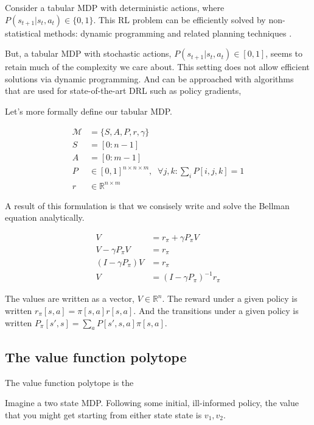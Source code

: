 Consider a tabular MDP with deterministic actions, where $P(s_{t+1}|s_t, a_t) \in \{ 0, 1\}$.
This RL problem can be efficiently solved by non-statistical
methods: dynamic programming and related planning techniques \cite{Bertsekas1995}.

But, a tabular MDP with stochastic actions, $P(s_{t+1}|s_t, a_t) \in [0, 1]$,
seems to retain much of the complexity we care about. This setting does not allow
efficient solutions via dynamic programming. And can be approached with algorithms
that are used for state-of-the-art DRL such as policy gradients,

Let's more formally define our tabular MDP.

\begin{align}
\mathcal M &= \{S, A, P, r, \gamma\} \\
S &= [0:n-1] \\
A &= [0:m-1] \\
P &\in [0,1]^{n\times n \times m}, \;\;\forall j, k : \sum_i P[i, j, k] = 1 \\
r &\in \mathbb R^{n\times m}
\end{align}

A result of this formulation is that we consisely write and solve the Bellman equation analytically.

\begin{align}
V &= r_{\pi} + \gamma P_{\pi} V \tag{the bellman eqn}\\
V - \gamma P_{\pi} V &= r_{\pi}\\
(I-\gamma P_{\pi})V &= r_{\pi}\\
V &= (I-\gamma P_{\pi})^{-1}r_{\pi}
\end{align}

The values are written as a vector, $V \in \mathbb R^n$.
The reward under a given policy is written $r_{\pi}[s, a] = \pi[s, a] r[s, a]$.
And the transitions under a given policy is written $P_{\pi}[s', s] = \sum_a P[s', s, a]\pi[s, a]$.


\subsection{The value function polytope}

The value function polytope \cite{Dadashi2018} is the


Imagine a two state MDP. Following some initial, ill-informed policy,
the value that you might get starting from either state state is $v_1, v_2$.



